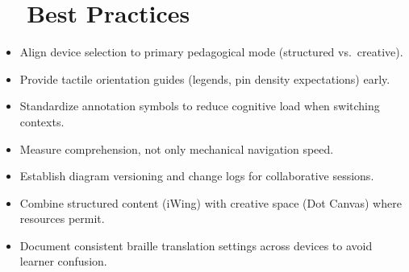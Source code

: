 \section{~~Best Practices}
\label{sec:sr29-best-practices}
\begin{itemize}
	\item Align device selection to primary pedagogical mode (structured vs.\ creative).
	\item Provide tactile orientation guides (legends, pin density expectations) early.
	\item Standardize annotation symbols to reduce cognitive load when switching contexts.
	\item Measure comprehension, not only mechanical navigation speed.
	\item Establish diagram versioning and change logs for collaborative sessions.
	\item Combine structured content (iWing) with creative space (Dot Canvas) where resources permit.
	\item Document consistent braille translation settings across devices to avoid learner confusion.
\end{itemize}

